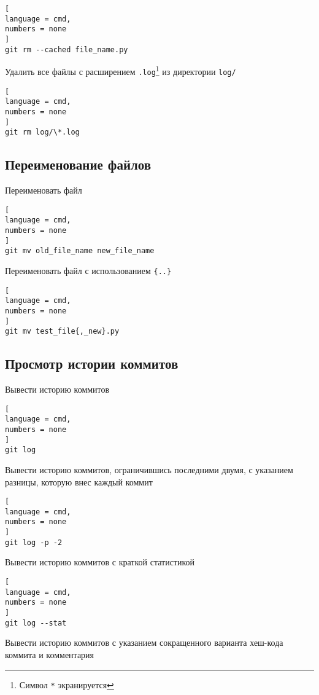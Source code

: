 \documentclass[%
	11pt,
	a4paper,
	utf8,
		]{article}
\begin{document}
\begin{lstlisting}[
language = cmd,
numbers = none
]
git rm --cached file_name.py
\end{lstlisting}


Удалить все файлы с расширением \texttt{.log}\footnote{Символ \texttt{*} экранируется} из директории \texttt{log/}

\begin{lstlisting}[
language = cmd,
numbers = none
]
git rm log/\*.log
\end{lstlisting}


\subsection{Переименование файлов}

Переименовать файл

\begin{lstlisting}[
language = cmd,
numbers = none
]
git mv old_file_name new_file_name
\end{lstlisting}


Переименовать файл с использованием \texttt{\{..\}}
\begin{lstlisting}[
language = cmd,
numbers = none
]
git mv test_file{,_new}.py
\end{lstlisting}


\subsection{Просмотр истории коммитов}

Вывести историю коммитов

\begin{lstlisting}[
language = cmd,
numbers = none
]
git log
\end{lstlisting}


Вывести историю коммитов, ограничившись последними двумя, с указанием разницы, которую внес каждый коммит

\begin{lstlisting}[
language = cmd,
numbers = none
]
git log -p -2
\end{lstlisting}

Вывести историю коммитов с краткой статистикой

\begin{lstlisting}[
language = cmd,
numbers = none
]
git log --stat
\end{lstlisting}

Вывести историю коммитов с указанием сокращенного варианта хеш-кода коммита и комментария
\end{document}
